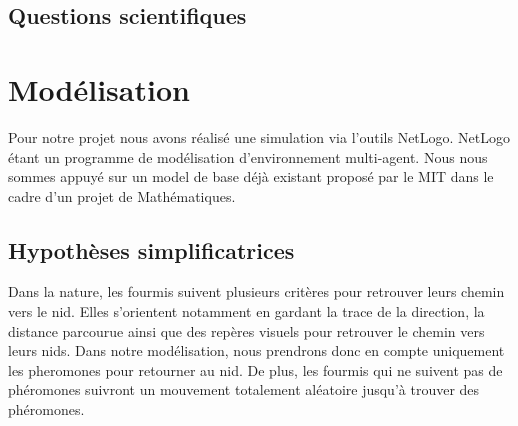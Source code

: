 \documentclass{article}
\begin{document}
\subsection{Questions scientifiques}
\section{Modélisation}
Pour notre projet nous avons réalisé une simulation via l'outils NetLogo. NetLogo étant un programme de modélisation d'environnement multi-agent. Nous nous sommes appuyé sur un model de base déjà existant proposé par le MIT dans le cadre d'un projet de Mathématiques.

\subsection{Hypothèses simplificatrices}
Dans la nature, les fourmis suivent plusieurs critères pour retrouver leurs chemin vers le nid. Elles s'orientent notamment en gardant la trace de la direction, la distance parcourue ainsi que des repères visuels pour retrouver le chemin vers leurs nids. Dans notre modélisation, nous prendrons donc en compte uniquement les pheromones pour retourner au nid. De plus, les fourmis qui ne suivent pas de phéromones suivront un mouvement totalement aléatoire jusqu'à trouver des phéromones.
\end{document}
